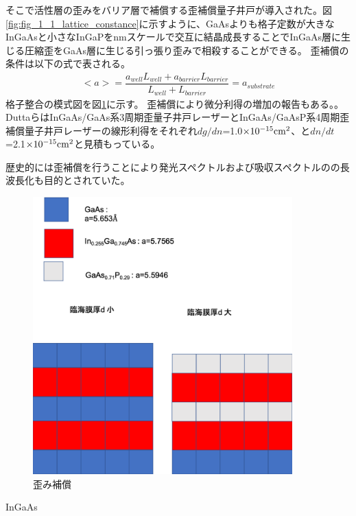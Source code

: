 そこで活性層の歪みをバリア層で補償する歪補償量子井戸が導入された。図\ref{fig:fig_1_1_lattice_constance}に示すように、GaAsよりも格子定数が大きなInGaAsと小さなInGaPをnmスケールで交互に結晶成長することで\rm{InGaAs}層に生じる圧縮歪をGaAs層に生じる引っ張り歪みで相殺することができる。
歪補償の条件は以下の式で表される。
\begin{eqnarray}
<a>=\dfrac{a_{well}L_{well}+a_{barrier}L_{barrier}}{L_{well}+L_{barrier}}=a_{substrate}
\end{eqnarray}
格子整合の模式図を図\ref{fig:fig_1_1_lattice_strain_comp}に示す。
歪補償により微分利得の増加の報告もある。\cite{ref_Dutta}。DuttaらはInGaAs/GaAs系3周期歪量子井戸レーザーとInGaAs/GaAsP系4周期歪補償量子井戸レーザーの線形利得をそれぞれ$dg/dn$=1.0$\times 10^{-15}\rm{cm^{2}}$、と$dn/dt$=2.1$\times 10^{-15}\rm{cm^{2}}$と見積もっている。

歴史的には歪補償を行うことにより発光スペクトルおよび吸収スペクトルのの長波長化も目的とされていた。



\begin{figure}[h]
	\centering
	\includegraphics[width=10cm]{figure/fig_1_1_lattice_strain.png}
	\caption{歪み補償}
	\label{fig:fig_1_1_lattice_strain_comp}
\end{figure}
InGaAs

